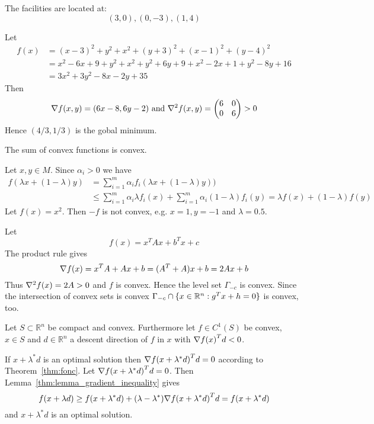 The facilities are located at:
\[
    (3, 0), (0, -3), (1, 4) 
\]

\proof{}
Let 
\[
    \begin{split}
        f(x)    & = {(x - 3)}^2 + y^2 + x^2 + {(y + 3)}^2 + {(x - 1)}^2 + {(y - 4)}^2 \\
                & = x^2 - 6x + 9 + y^2 + x^2 + y^2 + 6y + 9 + x^2 - 2x + 1 + y^2 -8y + 16 \\
                & = 3x^2 + 3y^2 - 8x - 2y + 35
    \end{split}
\]
Then
\[
    \nabla f(x, y) = (6x - 8, 6y - 2) \text{ and } \nabla^2 f(x, y) = 
        \begin{pmatrix}
            6 & 0 \\
            0 & 6 \\
        \end{pmatrix} > 0
\]
Hence \( (4 / 3, 1 / 3) \) is the gobal minimum. 
\bigskip


The sum of convex functions is convex.

\proof{}
Let \( x, y \in M \). Since \( \alpha_i  > 0 \) we have
\[
    \begin{split}
        f(\lambda x + (1 - \lambda) y) 
            & = \sum_{i=1}^m \alpha_i f_i(\lambda x + (1 - \lambda) y)) \\
            & \le \sum_{i=1}^m \alpha_i \lambda f_i(x) + \sum_{i=1}^m \alpha_i (1 - \lambda) f_i(y) 
                 =  \lambda f(x) + (1 - \lambda) f(y) 
    \end{split}
\]
Let \( f(x) = x^2 \). Then \( -f \) is not convex, e.g. \( x = 1, y = -1 \) and \( \lambda = 0.5 \).
\bigskip


Let 
\[
    f(x) = x^{T}Ax + b^{T}x + c 
\]
\proof{}
The product rule gives 
\[ 
    \nabla {f(x)} = x^{T}A + Ax + b = (A^{T} + A)x + b = 2Ax + b 
\] 
Thus \( \nabla^2 {f(x)} = 2A > 0 \) and \( f \) is convex. Hence the level set \( \Gamma_{-c} \) is convex.
Since the intersection of convex sets is convex \( \Gamma_{-c} \cap \{ x \in \mathbb{R}^n: g^{T}x + h = 0 \} \) is convex, too.
\bigskip


Let \( S \subset \mathbb{R}^n \) be compact and convex. Furthermore let \( f \in C^1(S) \) be convex,
\( x \in S \) and \( d \in \mathbb{R}^n \) a descent direction of \( f \) in \( x \) 
with \( \nabla {f(x)}^T d < 0 \).

\proof{}
If  \( x + \lambda^* d \) is an optimal solution then \( \nabla {f(x + \lambda^* d)}^T d = 0 \) 
according to Theorem~\ref{thm:fonc}.
Let \( \nabla {f(x + \lambda^* d)}^T d = 0 \). Then Lemma~\ref{thm:lemma_gradient_inequality} gives 
\[
    f(x + \lambda d) \ge f(x + \lambda^* d) + (\lambda - \lambda^*) \nabla {f(x + \lambda^* d)}^T d 
        = f(x + \lambda^* d) 
\]
and \( x + \lambda^* d \) is an optimal solution.
\bigskip


